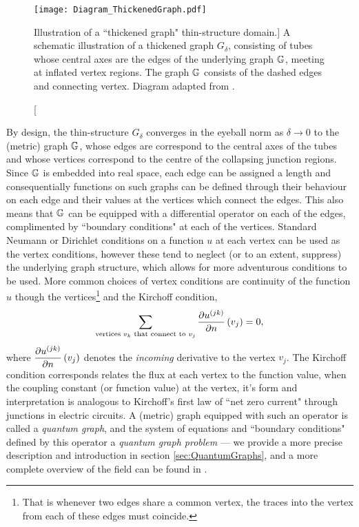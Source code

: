 \begin{figure}[t]
	\centering
	\texttt{[image: Diagram\_ThickenedGraph.pdf]}
	\caption[Illustration of a ``thickened graph" thin-structure domain.]{\label{fig:Diagram_ThickenedGraph} A schematic illustration of a thickened graph $G_{\delta}$, consisting of tubes whose central axes are the edges of the underlying graph $\mathbb{G}$, meeting at inflated vertex regions. The graph $\mathbb{G}$ consists of the dashed edges and connecting vertex. Diagram adapted from \cite[Figure 1]{exner2005convergence}.}
\end{figure}

By design, the thin-structure $G_{\delta}$ converges in the eyeball norm as $\delta\rightarrow0$ to the (metric) graph $\mathbb{G}$, whose edges are correspond to the central axes of the tubes and whose vertices correspond to the centre of the collapsing junction regions.
Since $\mathbb{G}$ is embedded into real space, each edge can be assigned a length and consequentially functions on such graphs can be defined through their behaviour on each edge and their values at the vertices which connect the edges.
This also means that $\mathbb{G}$ can be equipped with a differential operator on each of the edges, complimented by ``boundary conditions" at each of the vertices.
Standard Neumann or Dirichlet conditions on a function $u$ at each vertex can be used as the vertex conditions, however these tend to neglect (or to an extent, suppress) the underlying graph structure, which allows for more adventurous conditions to be used.
More common choices of vertex conditions are continuity of the function $u$ though the vertices\footnote{That is whenever two edges share a common vertex, the traces into the vertex from each of these edges must coincide.} and the Kirchoff condition,
\begin{align*}
	\sum_{\text{vertices } v_k \text{ that connect to } v_j} 
	\pdiff{u^{(jk)}}{n}\bracs{v_j} = 0, %
\end{align*}
where $\dfrac{\partial u^{(jk)}}{\partial n}\left( v_j \right)$ denotes the \emph{incoming} derivative to the vertex $v_j$. 
The Kirchoff condition corresponds relates the flux at each vertex to the function value, when the coupling constant (or function value) at the vertex, it's form and interpretation is analogous to Kirchoff's first law of ``net zero current" through junctions in electric circuits.
A (metric) graph equipped with such an operator is called a \emph{quantum graph}, and the system of equations and ``boundary conditions" defined by this operator a \emph{quantum graph problem} --- we provide a more precise description and introduction in section \ref{sec:QuantumGraphs}, and a more complete overview of the field can be found in \cite{berkolaiko2013introduction}.
